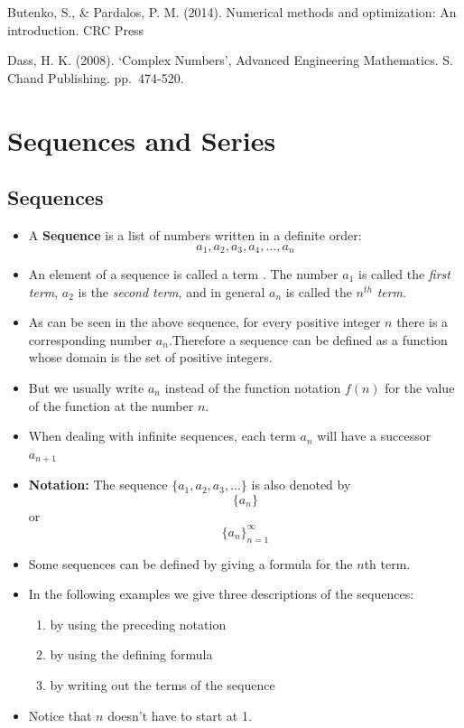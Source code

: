 \documentclass[]{book}
\providecommand{\tightlist}{%
  \setlength{\itemsep}{0pt}\setlength{\parskip}{0pt}}
\begin{document}
Butenko, S., \& Pardalos, P. M. (2014). Numerical methods and optimization: An introduction. CRC Press

Dass, H. K. (2008). `Complex Numbers', Advanced Engineering Mathematics. S. Chand Publishing. pp.~474-520.

\hypertarget{sequences-and-series}{%
\chapter{Sequences and Series}\label{sequences-and-series}}

\hypertarget{sequences}{%
\section{Sequences}\label{sequences}}

\begin{itemize}
\tightlist
\item
  A \textbf{Sequence} is a list of numbers written in a definite order:
  \[a_{1}, a_{2}, a_{3}, a_{4}, ..., a_{n}\]
\item
  An element of a sequence is called a term . The number \(a_{1}\) is called the \emph{first term}, \(a_{2}\) is the \emph{second term}, and in general \(a_{n}\) is called the \(n^{th}\) \emph{term}.
\item
  As can be seen in the above sequence, for every positive integer \(n\) there is a corresponding number \(a_{n}\).Therefore a sequence can be defined as a function whose domain is the set of positive integers.
\item
  But we usually write \(a_{n}\) instead of the function notation \(f(n)\) for the value of the function at the number \(n\).
\item
  When dealing with infinite sequences, each term \(a_{n}\) will have a successor \(a_{n+1}\)
\item
  \textbf{Notation:} The sequence \(\{a_{1}, a_{2}, a_{3},...\}\) is also denoted by
  \[\{a_{n}\}\] or \[\{a_{n}\}_{n=1}^{\infty}\]
\item
  Some sequences can be defined by giving a formula for the \(n\)th term.
\item
  In the following examples we give three descriptions of the sequences:

  \begin{enumerate}
  \def\labelenumi{\roman{enumi}.}
  \tightlist
  \item
    by using the preceding notation
  \item
    by using the defining formula
  \item
    by writing out the terms of the sequence
  \end{enumerate}
\item
  Notice that \(n\) doesn't have to start at 1.
\end{itemize}
\end{document}
